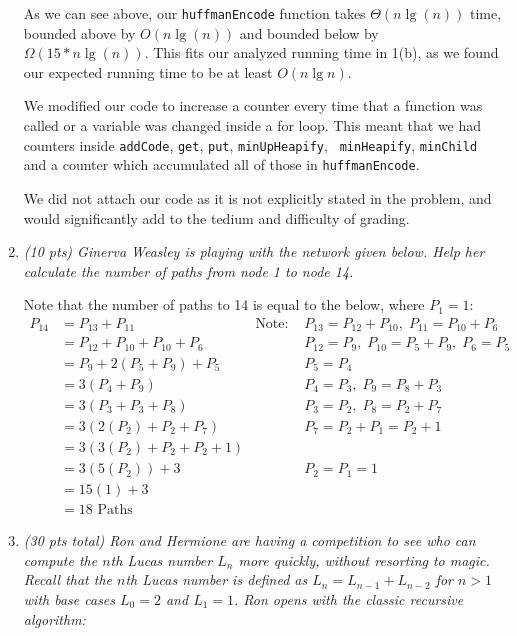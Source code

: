 \documentclass[12pt]{article}
\begin{document}
\begin{enumerate}
    As we can see above, our {\tt huffmanEncode} function takes $\Theta(n\lg (n))$ time, bounded above by $O(n\lg (n))$ and bounded below by $\Omega(15 * n\lg (n))$. This fits our analyzed running time in 1(b), as we found our 
expected running time to be at least $O(n\lg n)$.
    
    We modified our code to increase a counter every time that a function was called or a variable was changed inside a for loop. This meant that we had counters inside {\tt addCode}, {\tt get}, {\tt put}, {\tt minUpHeapify}, {\tt 
minHeapify}, {\tt minChild} and a counter which accumulated all of those in {\tt huffmanEncode}. 
    
    We did not attach our code as it is not explicitly stated in the problem, and would significantly add to the tedium and difficulty of grading. 

	\newpage
	\item \textit{(10 pts) Ginerva Weasley is playing with the network given below. Help her calculate the number of paths from node 1 to node 14.}
	
	Note that the number of paths to 14 is equal to the below, where $P_1 = 1$:
	\begin{align*}
	    P_{14} &= P_{13} + P_{11}  &\text{Note: } &P_{13} = P_{12} + P_{10}, \; P_{11} = P_{10} + P_6\\
	           &= P_{12} + P_{10} + P_{10} + P_{6}  &&P_{12} = P_9, \; P_{10} = P_5 + P_9, \; P_6 = P_5\\
	           &= P_{9} + 2(P_5 + P_9) + P_5 &&P_5 = P_4\\
	           &= 3(P_4 + P_9) &&P_4 = P_3, \; P_9 = P_8 + P_3\\
	           &= 3(P_3 + P_3 + P_8) &&P_3 = P_2, \; P_8 = P_2 + P_7\\
	           &= 3(2(P_2) + P_2 + P_7) &&P_7 = P_2 + P_1 = P_2 + 1 \\
	           &= 3(3(P_2) + P_2 + P_2 + 1) \\
	           &= 3(5(P_2)) + 3 &&P_2 = P_1 = 1\\
	           &= 15(1) + 3 \\
	           &= \boxed{18 \text{ Paths}}
	\end{align*}
	
	
    \newpage
	\item \textit{(30 pts total) Ron and Hermione are having a competition to see who can compute the $n$th Lucas number $L_{n}$ more quickly, without resorting to magic. Recall that the $n$th Lucas number is defined as $L_{n} 
= L_{n-1} +L_{n-2}$ for $n>1$ with base cases $L_{0} =2$ and $L_{1} =1$. Ron opens with the classic recursive algorithm:}
	

\end{enumerate}
\end{document}
